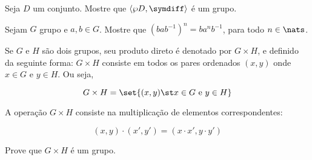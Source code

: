 \begin{exercise}
    Seja $D$ um conjunto. Mostre que $\langle \wp D, \symdiff \rangle$ é um grupo.
\end{exercise}

\begin{exercise}
    Sejam $G$ grupo e $a,b \in G$. Mostre que $(bab^{-1})^n = ba^nb^{-1}$, para todo $n \in \nats$.
\end{exercise}

\begin{exercise}
Se $G$ e $H$ são dois grupos, seu produto direto é denotado por $G \times H$, e definido da seguinte forma: $G \times H$ consiste em todos os pares ordenados $(x,y)$ onde $x \in G$ e $y \in H$. Ou seja,

$$
    G \times H = \set{(x,y) \st x \in G \text{ e } y \in H}
$$

A operação $G \times H$ consiste na multiplicação de elementos correspondentes:

$$
    (x,y) \cdot (x',y') = (x \cdot x', y \cdot y')
$$

Prove que $G \times H$ é um grupo.
\end{exercise}
